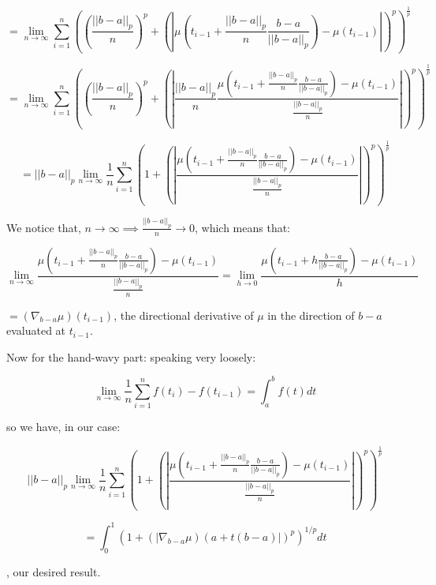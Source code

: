 \documentclass{article}
\begin{document}
    $$ = \lim_{n\to\infty} \sum_{i=1}^{n} ((\frac{||b-a||_p}{n})^p + (|\mu(t_{i-1} + 
    \frac{||b-a||_p}{n} \frac{b-a}{||b-a||_p}) - \mu(t_{i-1})|)^p)^{\frac{1}{p}}$$
    	
    $$ =  \lim_{n\to\infty} \sum_{i=1}^{n} ((\frac{||b-a||_p}{n})^p + (|\frac{||b-a||_p}{n} \frac{\mu(t_{i-1} + 
    \frac{||b-a||_p}{n} \frac{b-a}{||b-a||_p}) - \mu(t_{i-1})}{\frac{||b-a||_p}{n}}|)^p)^{\frac{1}{p}}$$

	$$ =  ||b-a||_p\lim_{n\to\infty} \frac{1}{n} \sum_{i=1}^{n} ( 1 + (|\frac{\mu(t_{i-1} + 
		\frac{||b-a||_p}{n} \frac{b-a}{||b-a||_p}) - \mu(t_{i-1})}{\frac{||b-a||_p}{n}}|)^p)^{\frac{1}{p}}$$
	
	 We notice that, $n\to \infty \implies \frac{||b-a||_p}{n} \to 0$, which means that:
	 
	 $$ \lim_{n\to\infty}  \frac{\mu(t_{i-1} + 
	 	\frac{||b-a||_p}{n} \frac{b-a}{||b-a||_p}) - \mu(t_{i-1})}{\frac{||b-a||_p}{n}} = 
 	\lim_{h\to 0}  \frac{\mu(t_{i-1} + 
 		h \frac{b-a}{||b-a||_p}) - \mu(t_{i-1})}{h} $$
 	
 	$ = (\nabla_{b-a} \mu)(t_{i-1})$, the directional derivative of $\mu$ in the direction of $b-a$ evaluated at $t_{i-1}$.
	 
	 Now for the hand-wavy part: speaking very loosely:
	
	$$\lim_{n\to\infty} \frac{1}{n} \sum_{i=1}^n f(t_{i}) - f(t_{i-1}) = \int_{a}^b f(t)dt$$
	
	so we have, in our case:
	
	$$||b-a||_p\lim_{n\to\infty} \frac{1}{n} \sum_{i=1}^{n} ( 1 + (|\frac{\mu(t_{i-1} + 
		\frac{||b-a||_p}{n} \frac{b-a}{||b-a||_p}) - \mu(t_{i-1})}{\frac{||b-a||_p}{n}}|)^p)^{\frac{1}{p}} $$
	
	$$= \int_{0}^{1} (1 + (|\nabla_{b-a} \mu)(a + t(b-a)|)^p)^{1/p} dt$$
	
	, our desired result.
	
\end{document}
